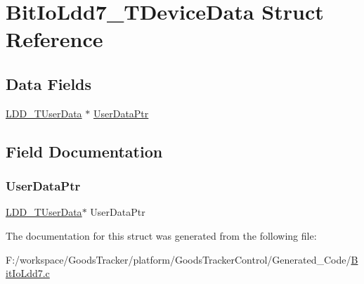 \hypertarget{struct_bit_io_ldd7___t_device_data}{}\section{Bit\+Io\+Ldd7\+\_\+\+T\+Device\+Data Struct Reference}
\label{struct_bit_io_ldd7___t_device_data}
\subsection*{Data Fields}
\begin{DoxyCompactItemize}
\item 
\hyperlink{group___p_e___types__module_ga0b66a73f87238a782318aa0be7578e35}{L\+D\+D\+\_\+\+T\+User\+Data} $\ast$ \hyperlink{struct_bit_io_ldd7___t_device_data_a8e77b9d030b00c231823350a904e0f83}{User\+Data\+Ptr}
\end{DoxyCompactItemize}


\subsection{Field Documentation}
\mbox{\label{struct_bit_io_ldd7___t_device_data_a8e77b9d030b00c231823350a904e0f83}} 
\subsubsection{\texorpdfstring{User\+Data\+Ptr}{UserDataPtr}}
{\footnotesize\ttfamily \hyperlink{group___p_e___types__module_ga0b66a73f87238a782318aa0be7578e35}{L\+D\+D\+\_\+\+T\+User\+Data}$\ast$ User\+Data\+Ptr}



The documentation for this struct was generated from the following file\+:\begin{DoxyCompactItemize}
\item 
F\+:/workspace/\+Goods\+Tracker/platform/\+Goods\+Tracker\+Control/\+Generated\+\_\+\+Code/\hyperlink{_bit_io_ldd7_8c}{Bit\+Io\+Ldd7.\+c}\end{DoxyCompactItemize}
